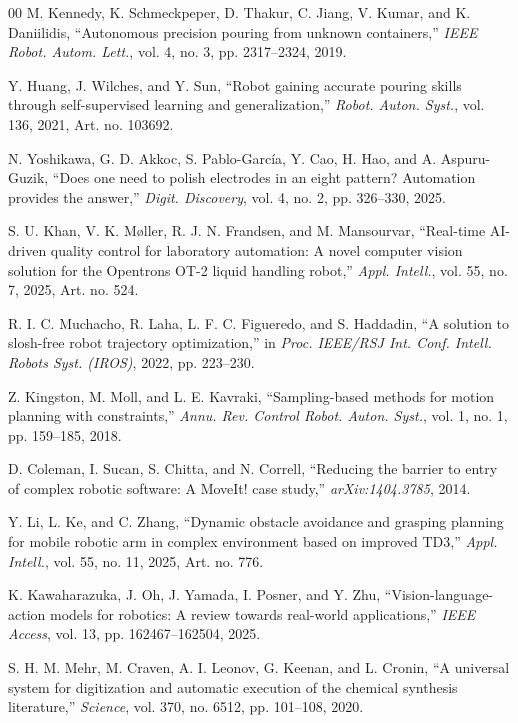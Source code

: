 \documentclass{ieeeaccess}
\begin{document}
\begin{thebibliography}{00}
 M. Kennedy, K. Schmeckpeper, D. Thakur, C. Jiang, V. Kumar, and K. Daniilidis, ``Autonomous precision pouring from unknown containers,'' \emph{IEEE Robot. Autom. Lett.}, vol. 4, no. 3, pp. 2317--2324, 2019.

 Y. Huang, J. Wilches, and Y. Sun, ``Robot gaining accurate pouring skills through self-supervised learning and generalization,'' \emph{Robot. Auton. Syst.}, vol. 136, 2021, Art. no. 103692.

 N. Yoshikawa, G. D. Akkoc, S. Pablo-Garc\'ia, Y. Cao, H. Hao, and A. Aspuru-Guzik, ``Does one need to polish electrodes in an eight pattern? Automation provides the answer,'' \emph{Digit. Discovery}, vol. 4, no. 2, pp. 326--330, 2025.

 S. U. Khan, V. K. M\o ller, R. J. N. Frandsen, and M. Mansourvar, ``Real-time AI-driven quality control for laboratory automation: A novel computer vision solution for the Opentrons OT-2 liquid handling robot,'' \emph{Appl. Intell.}, vol. 55, no. 7, 2025, Art. no. 524.

 R. I. C. Muchacho, R. Laha, L. F. C. Figueredo, and S. Haddadin, ``A solution to slosh-free robot trajectory optimization,'' in \emph{Proc. IEEE/RSJ Int. Conf. Intell. Robots Syst. (IROS)}, 2022, pp. 223--230.

 Z. Kingston, M. Moll, and L. E. Kavraki, ``Sampling-based methods for motion planning with constraints,'' \emph{Annu. Rev. Control Robot. Auton. Syst.}, vol. 1, no. 1, pp. 159--185, 2018.

 D. Coleman, I. Sucan, S. Chitta, and N. Correll, ``Reducing the barrier to entry of complex robotic software: A MoveIt! case study,'' \emph{arXiv:1404.3785}, 2014.

 Y. Li, L. Ke, and C. Zhang, ``Dynamic obstacle avoidance and grasping planning for mobile robotic arm in complex environment based on improved TD3,'' \emph{Appl. Intell.}, vol. 55, no. 11, 2025, Art. no. 776.

 K. Kawaharazuka, J. Oh, J. Yamada, I. Posner, and Y. Zhu, ``Vision-language-action models for robotics: A review towards real-world applications,'' \emph{IEEE Access}, vol. 13, pp. 162467--162504, 2025.

 S. H. M. Mehr, M. Craven, A. I. Leonov, G. Keenan, and L. Cronin, ``A universal system for digitization and automatic execution of the chemical synthesis literature,'' \emph{Science}, vol. 370, no. 6512, pp. 101--108, 2020.


\end{thebibliography}
\end{document}

